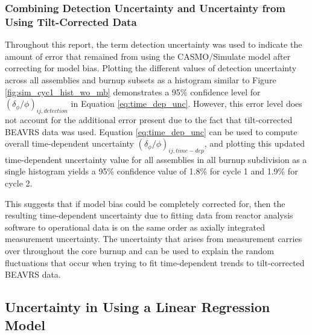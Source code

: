 \documentclass{article}
\begin{document}
\subsubsection{Combining Detection Uncertainty and Uncertainty from Using Tilt-Corrected Data}\label{sec:unc_combine}

Throughout this report, the term detection uncertainty was used to indicate the amount of error that remained from using the CASMO/Simulate model after correcting for model bias. Plotting the different values of detection uncertainty across all assemblies and burnup subsets as a histogram similar to Figure \ref{fig:sim_cyc1_hist_wo_mb} demonstrates a 95\% confidence level for $\left(\delta_\phi/\phi\right)_{ij,detection}$ in Equation \ref{eq:time_dep_unc}. However, this error level does not account for the additional error present due to the fact that tilt-corrected BEAVRS data was used. Equation \ref{eq:time_dep_unc} can be used to compute overall time-dependent uncertainty $\left(\delta_\phi/\phi\right)_{ij,time-dep}$, and plotting this updated time-dependent uncertainty value for all assemblies in all burnup subdivision as a single histogram yields a 95\% confidence value of 1.8\% for cycle 1 and 1.9\% for cycle 2.

This suggests that if model bias could be completely corrected for, then the resulting time-dependent uncertainty due to fitting data from reactor analysis software to operational data is on the same order as axially integrated measurement uncertainty. The uncertainty that arises from measurement carries over throughout the core burnup and can be used to explain the random fluctuations that occur when trying to fit time-dependent trends to tilt-corrected BEAVRS data. 

\subsection{Uncertainty in Using a Linear Regression Model}\label{sec:lm_uq}
\end{document}
